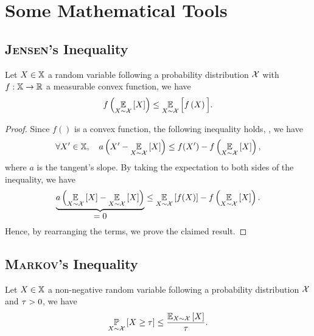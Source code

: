 \chapter{Some Mathematical Tools}

\section{\textsc{Jensen}'s Inequality}

\begin{theorem}
Let $X\in \mathbb{X}$ a random variable following a probability distribution $\mathcal{X}$ with $f: \mathbb{X}\to \mathbb{R}$ a measurable convex function, we have
\begin{align*}
    f\left(\operatorname*{\mathbb{E}}_{X\sim\mathcal{X}}\left[ X\right]\right) \le \operatorname*{\mathbb{E}}_{X\sim\mathcal{X}}\Big[ f\left( X\right) \Big].
\end{align*}
\label{ap:tools:theorem:jensen}
\end{theorem}
\begin{noaddcontents}\begin{proof}
Since $f()$ is a convex function, the following inequality holds, \ie, we have
\begin{align*}
\forall X'\in\mathbb{X},\quad a\left( X' - \operatorname*{\mathbb{E}}_{X\sim\mathcal{X}}\left[ X\right]\right) \le f(X') - f\left(\operatorname*{\mathbb{E}}_{X\sim\mathcal{X}}\left[ X\right]\right),
\end{align*}
where $a$ is the tangent's slope.
By taking the expectation to both sides of the inequality, we have
\begin{align*}
\underbrace{a\left( \operatorname*{\mathbb{E}}_{X\sim\mathcal{X}}\left[ X\right] - \operatorname*{\mathbb{E}}_{X\sim\mathcal{X}}\left[ X\right]\right)}_{\displaystyle = 0} \le \operatorname*{\mathbb{E}}_{X\sim\mathcal{X}}\left[ f(X)\right] - f\left(\operatorname*{\mathbb{E}}_{X\sim\mathcal{X}}\left[ X\right]\right).
\end{align*}
Hence, by rearranging the terms, we prove the claimed result.
\end{proof}\end{noaddcontents}

\section{\textsc{Markov}'s Inequality}
\label{ap:tools:sec:markov}

\begin{theorem} Let $X\in \mathbb{X}$ a non-negative random variable  following a probability distribution $\mathcal{X}$ and $\tau>0$, we have
\begin{align*}
    \operatorname*{\mathbb{P}}_{X\sim\mathcal{X}}\left[ X\ge \tau\right] \le \frac{\operatorname*{\mathbb{E}}_{X\sim\mathcal{X}}\left[ X\right]}{\tau}.
\end{align*}
\label{ap:tools:theorem:first-markov}
\end{theorem}

